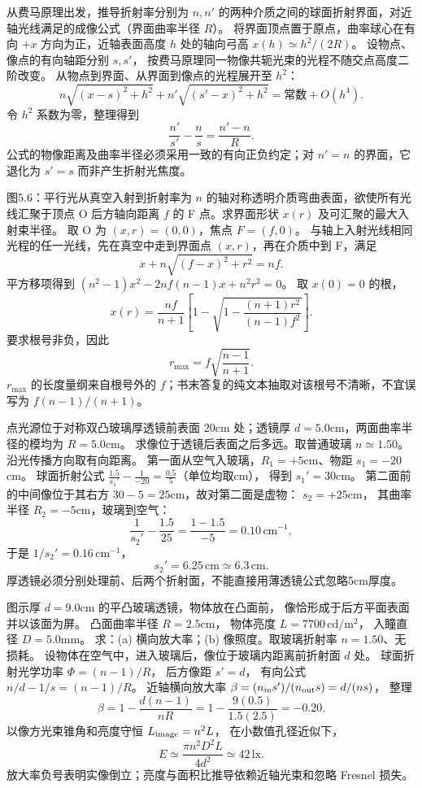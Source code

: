 从费马原理出发，推导折射率分别为
$n,n'$ 的两种介质之间的球面折射界面，对近轴光线满足的成像公式（界面曲率半径 $R$）。
\exsolution
将界面顶点置于原点，曲率球心在有向 $+x$ 方向为正，近轴表面高度 $h$ 处的轴向弓高
$x(h)\simeq h^2/(2R)$。
设物点、像点的有向轴距分别 $s,s'$，
按费马原理同一物像共轭光束的光程不随交点高度二阶改变。
从物点到界面、从界面到像点的光程展开至 $h^2$：
\[
n\sqrt{(x-s)^2+h^2}
+n'\sqrt{(s'-x)^2+h^2}
=\text{常数}+O(h^4).
\]
令 $h^2$ 系数为零，整理得到
\[
\boxed{\frac{n'}{s'}-\frac n{s}
=\frac{n'-n}{R}}.
\]
\excheck 公式的物像距离及曲率半径必须采用一致的有向正负约定；对 $n'=n$ 的界面，它退化为 $s'=s$ 而非产生折射光焦度。

图5.6：平行光从真空入射到折射率为 $n$ 的轴对称透明介质弯曲表面，欲使所有光线汇聚于顶点 O 后方轴向距离 $f$ 的 F 点。求界面形状 $x(r)$ 及可汇聚的最大入射束半径。
\exsolution
取 O 为 $(x,r)=(0,0)$，焦点 $F=(f,0)$。
与轴上入射光线相同光程的任一光线，先在真空中走到界面点 $(x,r)$，再在介质中到 F，满足
\[
x+n\sqrt{(f-x)^2+r^2}=nf.
\]
平方移项得到
$(n^2-1)x^2-2nf(n-1)x+n^2r^2=0$。
取 $x(0)=0$ 的根，
\[
\boxed{x(r)=\frac{nf}{n+1}
\left[1-\sqrt{1-\frac{(n+1)r^2}{(n-1)f^2}}\right]}.
\]
要求根号非负，因此
\[
\boxed{r_{\max}=f\sqrt{\frac{n-1}{n+1}}}.
\]
\excheck $r_{\max}$ 的长度量纲来自根号外的 $f$；书末答复的纯文本抽取对该根号不清晰，不宜误写为 $f(n-1)/(n+1)$。

点光源位于对称双凸玻璃厚透镜前表面
$20$cm 处；透镜厚 $d=5.0$cm，两面曲率半径的模均为
$R=5.0$cm。
求像位于透镜后表面之后多远。取普通玻璃
$n\simeq1.50$。
\exsolution
沿光传播方向取有向距离。
第一面从空气入玻璃，$R_1=+5$cm、物距 $s_1=-20$cm。
球面折射公式
$\frac{1.5}{s_1'}-\frac1{-20}
=\frac{0.5}{5}$（单位均取cm），
得到
$s_1'=30$cm。
第二面前的中间像位于其右方
$30-5=25$cm，故对第二面是虚物：
$s_2=+25$cm，
其曲率半径 $R_2=-5$cm，玻璃到空气：
\[
\frac1{s_2'}-\frac{1.5}{25}
=\frac{1-1.5}{-5}=0.10\,\mathrm{cm^{-1}},
\]
于是
$1/s_2'=0.16\,\mathrm{cm^{-1}}$，
\[
\boxed{s_2'=6.25\,\mathrm{cm}
\simeq6.3\,\mathrm{cm}}.
\]
\excheck 厚透镜必须分别处理前、后两个折射面，不能直接用薄透镜公式忽略5cm厚度。

图示厚 $d=9.0$cm 的平凸玻璃透镜，物体放在凸面前，
像恰形成于后方平面表面并以该面为屏。
凸面曲率半径 $R=2.5$cm，
物体亮度 $L=7700\,\mathrm{cd/m^2}$，
入瞳直径 $D=5.0$mm。
求：(a) 横向放大率；(b) 像照度。取玻璃折射率 $n=1.50$、无损耗。
\exsolution
设物体在空气中，进入玻璃后，像位于玻璃内距离前折射面 $d$ 处。
球面折射光学功率
$\Phi=(n-1)/R$，
后方像距 $s'=d$，
有向公式
$n/d-1/s=(n-1)/R$。
近轴横向放大率
$\beta=(n_{\rm in}s')/(n_{\rm out}s)
=d/(ns)$，
整理
\[
\boxed{\beta=1-\frac{d(n-1)}{nR}
=1-\frac{9(0.5)}{1.5(2.5)}
=-0.20}.
\]
以像方光束锥角和亮度守恒
$L_{\rm image}=n^2L$，
在小数值孔径近似下，
\[
\boxed{E\simeq\frac{\pi n^2D^2L}{4d^2}
\simeq42\,\mathrm{lx}}.
\]
\excheck 放大率负号表明实像倒立；亮度与面积比推导依赖近轴光束和忽略 Fresnel 损失。

